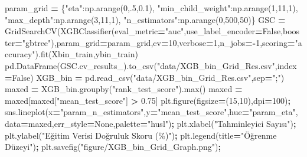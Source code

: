 \documentclass[12pt,twoside]{deuthesis}
\newenvironment{Shaded}{\begin{snugshade}}{\end{snugshade}}
\newcommand{\BuiltInTok}[1]{#1}
\newcommand{\DecValTok}[1]{\textcolor[rgb]{0.00,0.00,0.81}{#1}}
\newcommand{\FloatTok}[1]{\textcolor[rgb]{0.00,0.00,0.81}{#1}}
\newcommand{\NormalTok}[1]{#1}
\newcommand{\OperatorTok}[1]{\textcolor[rgb]{0.81,0.36,0.00}{\textbf{#1}}}
\newcommand{\StringTok}[1]{\textcolor[rgb]{0.31,0.60,0.02}{#1}}
\newcommand{\VariableTok}[1]{\textcolor[rgb]{0.00,0.00,0.00}{#1}}
\begin{document}
\begin{Shaded}
\begin{Highlighting}[]
\NormalTok{param\_grid }\OperatorTok{=}\NormalTok{ \{}\StringTok{"eta"}\NormalTok{:np.arange(}\DecValTok{0}\NormalTok{,}\FloatTok{.5}\NormalTok{,}\FloatTok{0.1}\NormalTok{),}
              \StringTok{"min\_child\_weight"}\NormalTok{:np.arange(}\DecValTok{1}\NormalTok{,}\DecValTok{11}\NormalTok{,}\DecValTok{1}\NormalTok{),}
              \StringTok{"max\_depth"}\NormalTok{:np.arange(}\DecValTok{3}\NormalTok{,}\DecValTok{11}\NormalTok{,}\DecValTok{1}\NormalTok{),}
              \StringTok{"n\_estimators"}\NormalTok{:np.arange(}\DecValTok{0}\NormalTok{,}\DecValTok{500}\NormalTok{,}\DecValTok{50}\NormalTok{)\}}
\NormalTok{GSC }\OperatorTok{=}\NormalTok{ GridSearchCV(XGBClassifier(eval\_metric}\OperatorTok{=}\StringTok{"auc"}\NormalTok{,use\_label\_encoder}\OperatorTok{=}\VariableTok{False}\NormalTok{,booster}\OperatorTok{=}\StringTok{"gbtree"}\NormalTok{),param\_grid}\OperatorTok{=}\NormalTok{param\_grid,cv}\OperatorTok{=}\DecValTok{10}\NormalTok{,verbose}\OperatorTok{=}\DecValTok{1}\NormalTok{,n\_jobs}\OperatorTok{={-}}\DecValTok{1}\NormalTok{,scoring}\OperatorTok{=}\StringTok{"accuracy"}\NormalTok{).fit(Xbin\_train,ybin\_train)}
\NormalTok{pd.DataFrame(GSC.cv\_results\_).to\_csv(}\StringTok{"data/XGB\_bin\_Grid\_Res.csv"}\NormalTok{,index}\OperatorTok{=}\VariableTok{False}\NormalTok{)}
\NormalTok{XGB\_bin }\OperatorTok{=}\NormalTok{ pd.read\_csv(}\StringTok{"data/XGB\_bin\_Grid\_Res.csv"}\NormalTok{,sep}\OperatorTok{=}\StringTok{";"}\NormalTok{)}
\NormalTok{maxed }\OperatorTok{=}\NormalTok{ XGB\_bin.groupby(}\StringTok{"rank\_test\_score"}\NormalTok{).}\BuiltInTok{max}\NormalTok{()}
\NormalTok{maxed }\OperatorTok{=}\NormalTok{ maxed[maxed[}\StringTok{"mean\_test\_score"}\NormalTok{] }\OperatorTok{\textgreater{}} \FloatTok{0.75}\NormalTok{]}
\NormalTok{plt.figure(figsize}\OperatorTok{=}\NormalTok{(}\DecValTok{15}\NormalTok{,}\DecValTok{10}\NormalTok{),dpi}\OperatorTok{=}\DecValTok{100}\NormalTok{)}\OperatorTok{;}
\NormalTok{sns.lineplot(x}\OperatorTok{=}\StringTok{"param\_n\_estimators"}\NormalTok{,y}\OperatorTok{=}\StringTok{"mean\_test\_score"}\NormalTok{,hue}\OperatorTok{=}\StringTok{"param\_eta"}\NormalTok{,data}\OperatorTok{=}\NormalTok{maxed,err\_style}\OperatorTok{=}\VariableTok{None}\NormalTok{,palette}\OperatorTok{=}\StringTok{"husl"}\NormalTok{)}\OperatorTok{;}
\NormalTok{plt.xlabel(}\StringTok{"Tahminleyici Sayısı"}\NormalTok{)}\OperatorTok{;}
\NormalTok{plt.ylabel(}\StringTok{"Eğitim Verisi Doğruluk Skoru (\%)"}\NormalTok{)}\OperatorTok{;}
\NormalTok{plt.legend(title}\OperatorTok{=}\StringTok{"Öğrenme Düzeyi"}\NormalTok{)}\OperatorTok{;}
\NormalTok{plt.savefig(}\StringTok{"figure/XGB\_bin\_Grid\_Graph.png"}\NormalTok{)}\OperatorTok{;}
\end{Highlighting}
\end{Shaded}
\end{document}
